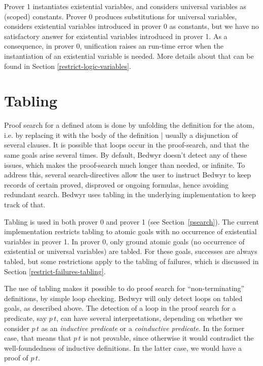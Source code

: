 Prover 1 instantiates existential variables, and considers universal variables
as (scoped) constants. Prover 0 produces substitutions for universal variables,
considers existential variables introduced in prover 0 as constants,
but we have no satisfactory answer for existential variables introduced in
prover 1.
As a consequence, in prover 0, unification raises an run-time error
when the instantiation of an existential variable is needed.
More details about that can be found in Section \ref{restrict-logic-variables}.


\section{Tabling}
\label{tabling}

Proof search for a defined atom is done by unfolding the definition
for the atom, i.e. by replacing it with the body of the definition |
usually a disjunction of several clauses.
It is possible that loops occur in the proof-search,
and that the same goals arise several times.
By default, Bedwyr doesn't detect any of these issues, which makes the
proof-search much longer than needed, or infinite.
To address this, several search-directives
allow the user to instruct Bedwyr to keep records of certain
proved, disproved or ongoing formulas,
hence avoiding redundant search.
Bedwyr uses tabling in the underlying implementation to keep track of that.

Tabling is used in both prover 0 and prover 1 (see Section~\ref{psearch}).
The current implementation restricts tabling to atomic goals
with no occurrence of existential variables in prover 1.
In prover 0, only ground atomic goals (no occurrence of existential or universal
variables) are tabled.
For these goals, successes are always tabled, but some restrictions apply
to the tabling of failures, which is discussed in Section
\ref{restrict-failures-tabling}.

The use of tabling makes it possible to do proof search for
``non-terminating'' definitions, by simple loop checking.
Bedwyr will only detect loops on tabled goals, as described above.
The detection of a loop in the proof search for a predicate, say
$p\,t$, can have several interpretations, depending on whether
we consider $p\,t$ as an {\em inductive predicate} or
a {\em coinductive predicate}. In the former case, that means that
$p\,t$ is not provable, since otherwise it would contradict
the well-foundedness of inductive definitions. In the latter case,
we would have a proof of $p\,t$.

